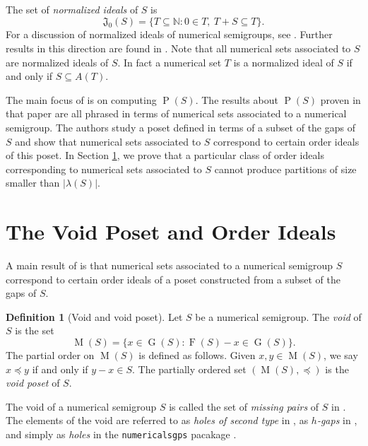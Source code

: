 \documentclass{amsproc}
\DeclareMathOperator{\F}{F}
\DeclareMathOperator{\G}{G}
\DeclareMathOperator{\Pa}{P}
\DeclareMathOperator{\M}{M}
\theoremstyle{definition}
\newtheorem{definition}[theorem]{Definition}
\theoremstyle{remark}
\numberwithin{equation}{section}
\begin{document}
The set of \emph{normalized ideals} of $S$ is
\[
\mathfrak{J}_0(S)=\{T\subseteq \mathbb{N}\colon  0\in T,\ T+S\subseteq T\}.
\]
For a discussion of normalized ideals of numerical semigroups, see \cite[Section 3]{BonzioGarciaSanchez}.  Further results in this direction are found in \cite{barucci2016class,casabella2024apery}. 
Note that all numerical sets associated to $S$ are normalized ideals of $S$. In fact a numerical set $T$ is a normalized ideal of $S$ if and only if $S\subseteq A(T)$.

The main focus of \cite{chen2023enumeratingnumericalsetsassociated} is on computing $\Pa(S)$. 
The results about $\Pa(S)$ proven in that paper are all phrased in terms of numerical sets associated to a numerical semigroup. 
The authors study a poset defined in terms of a subset of the gaps of $S$ and show that numerical sets associated to $S$ correspond to certain order ideals of this poset. 
In Section \ref{sec:void}, we prove that a particular class of order ideals corresponding to numerical sets associated to $S$ cannot produce partitions of size smaller than $|\lambda(S)|$.








\section{The Void Poset and Order Ideals}\label{sec:void}

A main result of \cite{chen2023enumeratingnumericalsetsassociated} is that numerical sets associated to a numerical semigroup $S$ correspond to certain order ideals of a poset constructed from a subset of the gaps of $S$. 
\begin{definition}[Void and void poset]
    Let $S$ be a numerical semigroup. The \emph{void} of $S$ is the set
    \[
    \M(S) = \{x\in \G(S) \colon \F(S)-x \in \G(S)\}.
    \]
The partial order on $\M(S)$ is defined as follows. Given $x, y \in \M(S)$, we say $x \preccurlyeq y$ if and only if $y-x \in S$. The partially ordered set $(\M(S),\preccurlyeq)$ is the \emph{void poset} of $S$.
\end{definition}
\noindent The void of a numerical semigroup $S$ is called the set of \textit{missing pairs} of $S$ in \cite{CONSTANTIN201799}. 
The elements of the void are referred to as \emph{holes of second type} in \cite{patil2007type}, as \emph{$h$-gaps} in \cite{aicardi2010gaps}, and simply as \emph{holes} in the \texttt{numericalsgps} pacakage \cite{NumericalSgps}.
\end{document}
